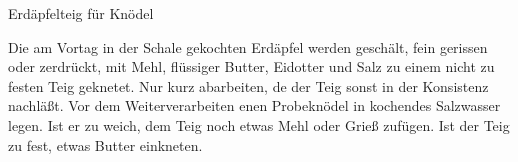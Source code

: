 \begin{recipe}[\vegetarian]{Erdäpfelteig für Knödel}%

    \begin{ingredients}
    \end{ingredients}

    \begin{instructions}
        Die am Vortag in der Schale gekochten Erdäpfel werden geschält, fein gerissen oder zerdrückt, mit Mehl, flüssiger Butter, Eidotter und Salz zu einem nicht zu festen Teig geknetet.
        Nur kurz abarbeiten, de der Teig sonst in der Konsistenz nachläßt.
        Vor dem Weiterverarbeiten enen Probeknödel in kochendes Salzwasser legen.
        Ist er zu weich, dem Teig noch etwas Mehl oder Grieß zufügen.
        Ist der Teig zu fest, etwas Butter einkneten.
    \end{instructions}
\end{recipe}
